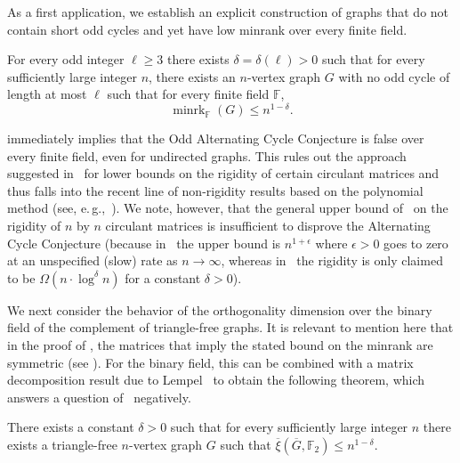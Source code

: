 \documentclass{toc}
\newcommand{\Fset}{\mathbb{F}}
\newcommand{\od}{\overline{\xi}}
\newcommand{\eps}{\epsilon}
\newcommand{\minrank}{\mathop{\mathrm{minrk}}}
\begin{document}
As a first application, we establish an explicit construction of graphs that do not contain short odd cycles and yet have low minrank over every finite field.
\begin{theorem}\label{thm:Intro_Cycles}
For every odd integer $\ell \geq 3$ there exists $\delta = \delta(\ell) >0$ such that for every sufficiently large integer $n$, there exists an $n$-vertex graph $G$ with no odd cycle of length at most $\ell$ such that for every finite field $\Fset$,
\[{\minrank}_{\Fset}(G) \leq n^{1-\delta}.\]
\end{theorem}
\noindent
{} immediately implies that the Odd Alternating Cycle Conjecture is false over every finite field, even for undirected graphs.
This rules out the approach suggested in~\cite{CodenottiPR00} for lower bounds on the rigidity of certain circulant matrices and thus falls into the recent line of non-rigidity results based on the polynomial method (see, e.\,g.,~\cite{AlmanW17,dvir2019matrix,DvirL19}).
We note, however, that the general upper bound of~\cite{DvirL19} on the rigidity of $n$ by $n$ circulant matrices
%
%
%
is insufficient to disprove the Alternating Cycle Conjecture
(because in~\cite{DvirL19} the upper bound is $n^{1+\eps}$
%
where $\eps > 0$ goes to zero at an unspecified (slow) rate
as $n\to\infty$,  %
whereas in~\cite{CodenottiPR00} the rigidity is only claimed to be
%
%
$\Omega(n \cdot \log^\delta n)$ for a constant $\delta > 0$).

We next consider the behavior of the orthogonality dimension over the binary field of the complement of triangle-free graphs.
It is relevant to mention here that in the proof of , the matrices that imply the stated bound on the minrank are symmetric (see ). For the binary field, this can be combined with a matrix decomposition result due to Lempel~\cite{Lempel75} to obtain the following theorem, which answers a question of~\cite{CodenottiPR00} negatively.
\begin{theorem}\label{thm:IntroTriangleFree}
There exists a constant $\delta >0$ such that for every sufficiently large integer $n$ there exists a triangle-free $n$-vertex graph $G$ such that $\od(\overline{G},\Fset_2) \leq n^{1-\delta}$.
\end{theorem}
\end{document}
